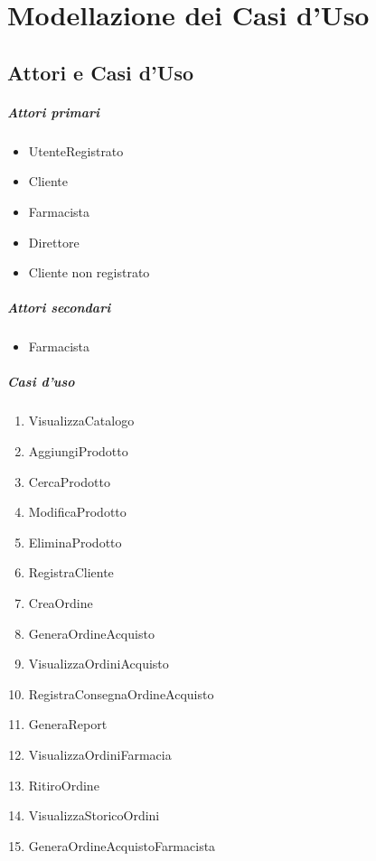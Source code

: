 \chapter{Modellazione dei Casi d'Uso}

\section{Attori e Casi d'Uso}

\paragraph{Attori primari}
\begin{itemize}
	\item UtenteRegistrato
	\item Cliente
	\item Farmacista
	\item Direttore
	\item Cliente non registrato
\end{itemize}

\paragraph{Attori secondari}
\begin{itemize}
	\item Farmacista
\end{itemize}

\paragraph{Casi d'uso}
\begin{enumerate}
	\item VisualizzaCatalogo %
	\item AggiungiProdotto %
	\item CercaProdotto %
	\item ModificaProdotto %
	\item EliminaProdotto %
	\item RegistraCliente %
	\item CreaOrdine %
	\item GeneraOrdineAcquisto %
	\item VisualizzaOrdiniAcquisto %
	\item RegistraConsegnaOrdineAcquisto %
	\item GeneraReport %
	\item VisualizzaOrdiniFarmacia %
	\item RitiroOrdine %
	\item VisualizzaStoricoOrdini %
	\item GeneraOrdineAcquistoFarmacista %
\end{enumerate}

